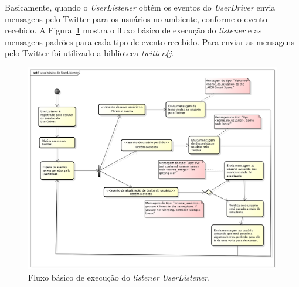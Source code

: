 	Basicamente, quando o \textit{UserListener} obtém os eventos do \textit{UserDriver} envia mensagens pelo Twitter para os usuários no ambiente, conforme o evento recebido. A Figura~\ref{fig:diagrama-tweet} mostra o fluxo básico de execução do \textit{listener} e as mensagens padrões para cada tipo de evento recebido. Para enviar as mensagens pelo Twitter foi utilizado a biblioteca \textit{twitter4j}. 

	\begin{figure}[hbt]
			\begin{center}
				\includegraphics[scale=0.45]{figuras/5.Testes/diagrama-user-tweet.png}
			\end{center}
			\caption{Fluxo básico de execução do \textit{listener} \textit{UserListener}.}
			\label{fig:diagrama-tweet}
		\end{figure}












